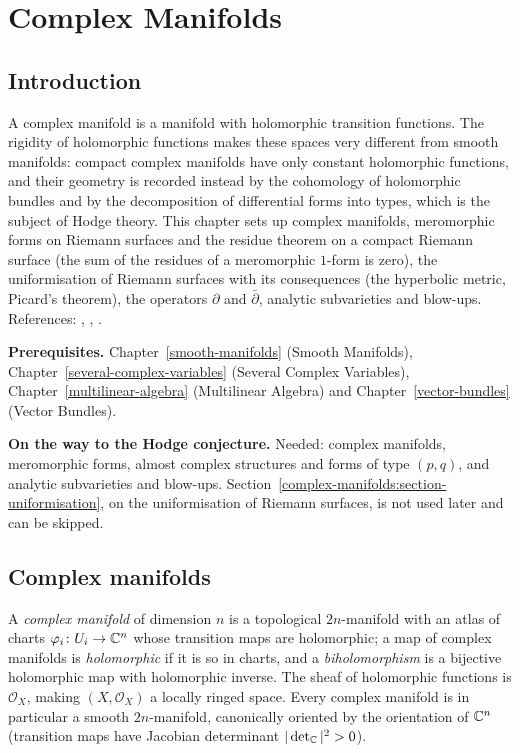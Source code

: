 \chapter{Complex Manifolds}\label{complex-manifolds}

\section{Introduction}\label{complex-manifolds:section-introduction}

A complex manifold is a manifold with holomorphic transition functions. The rigidity of holomorphic functions makes these spaces
very different from smooth manifolds: compact complex manifolds have only constant holomorphic functions, and their geometry is
recorded instead by the cohomology of holomorphic bundles and by the decomposition of differential forms into types, which is the
subject of Hodge theory. This chapter sets up complex manifolds, meromorphic forms on Riemann surfaces and the residue theorem on a compact Riemann surface (the sum of the residues of a
meromorphic $1$-form is zero), the uniformisation of Riemann surfaces with its consequences (the hyperbolic metric, Picard's theorem),
the operators $\partial$ and $\bar\partial$, analytic subvarieties and
blow-ups. References: \cite[Chapter 0]{griffiths-harris}, \cite[Chapter 2]{huybrechts-complex},
\cite[Chapter 3]{voisin-hodge-1}.

\noindent\textbf{Prerequisites.} Chapter~\ref{smooth-manifolds} (Smooth Manifolds), Chapter~\ref{several-complex-variables} (Several
Complex Variables), Chapter~\ref{multilinear-algebra} (Multilinear Algebra) and Chapter~\ref{vector-bundles} (Vector Bundles).

\noindent\textbf{On the way to the Hodge conjecture.} Needed: complex manifolds, meromorphic forms, almost complex structures and forms of type $(p,q)$, and analytic subvarieties and blow-ups.
Section~\ref{complex-manifolds:section-uniformisation}, on the uniformisation of Riemann surfaces, is not used later and can be skipped.

\section{Complex manifolds}\label{complex-manifolds:section-manifolds}

\begin{definition}\label{complex-manifolds:definition-complex-manifold}
A \emph{complex manifold} of dimension $n$ is a topological $2n$-manifold with an atlas of charts $\varphi_i \colon U_i \to \mathbb{C}^n$ whose transition maps are holomorphic; a map of complex manifolds is
\emph{holomorphic} if it is so in charts, and a \emph{biholomorphism} is a bijective holomorphic map with holomorphic inverse. The sheaf of holomorphic functions is $\mathcal{O}_X$, making $(X, \mathcal{O}_X)$ a
locally ringed space. Every complex manifold is in particular a smooth $2n$-manifold, canonically oriented by the orientation of $\mathbb{C}^n$ (transition maps have Jacobian determinant $|\det_{\mathbb{C}}|^2 > 0$).
\end{definition}

